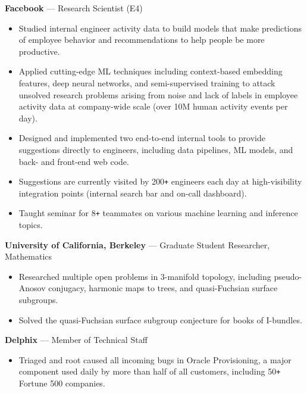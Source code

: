 \documentclass[10pt,letterpaper]{article}
\newcommand{\archive}[1]{}
\newcommand{\dates}[1]{\item[#1\hfill]}
\newcommand{\jobhead}[3]{{\dates{#1}{\bf #2} --- {#3}}}
\newenvironment{jobs}
  {\leftmargini=24.1mm%
   \begin{list}%
    {}
    {\setlength\labelwidth{22mm}\itemsep=1.5mm}}
  {\end{list}}
\begin{document}
\begin{jobs}

	\jobhead{2017\,--} {Facebook}{Research Scientist (E4)} \begin{itemize}

\item Studied internal engineer activity data to build models that make
	predictions of employee behavior and recommendations to help people be
	more productive.

\item Applied cutting-edge ML techniques including context-based embedding
	features, deep neural networks, and semi-supervised training to attack
	unsolved research problems arising from noise and lack of labels
	in employee activity data at company-wide scale (over 10M
	human activity events per day).

\item Designed and implemented two end-to-end internal tools to provide
	suggestions directly to engineers, including data pipelines, ML models,
	and back- and front-end web code.

\item Suggestions are currently visited by 200\verb!+! engineers each day at
	high-visibility integration points (internal search bar and on-call
	dashboard).

\item Taught seminar for 8\verb!+! teammates on various machine learning and
	inference topics.

\end{itemize}

\jobhead{2011\,--\,2017} {University of California, Berkeley}{Graduate Student
Researcher, Mathematics}
\begin{itemize}

\item Researched multiple open problems in 3-manifold topology, including
	pseudo-Anosov conjugacy, harmonic maps to trees, and quasi-Fuchsian
	surface subgroups.

\item Solved the quasi-Fuchsian surface subgroup conjecture for books of
	I-bundles. \archive{Currently preparing paper for submission.}

\end{itemize}


\jobhead{2015\,--\,2016} {Delphix}{Member of Technical Staff} \begin{itemize}

\item Triaged and root caused all incoming bugs in Oracle Provisioning,
a major component used daily by more than half of all customers,
including 50\verb!+! Fortune 500 companies.


\end{itemize}
\end{jobs}
\end{document}

